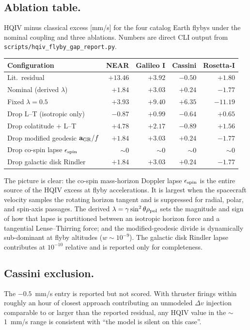 \documentclass[11pt]{amsart}
\begin{document}
\subsection*{Ablation table.}
HQIV minus classical excess [mm/s] for the four catalog Earth flybys under the nominal
coupling and three ablations. Numbers are direct CLI output from
\texttt{scripts/hqiv\_flyby\_gap\_report.py}.
\begin{center}
\begin{tabular}{@{}lrrrr@{}}
\toprule
Configuration & NEAR & Galileo I & Cassini & Rosetta-I \\
\midrule
Lit.\ residual           & $+13.46$ & $+3.92$ & $-0.50$ & $+1.80$ \\
\midrule
Nominal (derived $\lambda$)        & $+1.84$ & $+3.03$ & $+0.24$ & $-1.77$ \\
Fixed $\lambda=0.5$                & $+3.93$ & $+9.40$ & $+6.35$ & $-11.19$ \\
Drop L--T (isotropic only)         & $-0.87$ & $+0.99$ & $-0.64$ & $+0.65$ \\
Drop colatitude $+$ L--T           & $+4.78$ & $+2.17$ & $-0.89$ & $+1.56$ \\
Drop modified geodesic $\mathbf a_{\rm GR}/f$ & $+1.84$ & $+3.03$ & $+0.24$ & $-1.77$ \\
Drop co-spin lapse $\epsilon_{\rm spin}$ & $\sim 0$ & $\sim 0$ & $\sim 0$ & $\sim 0$ \\
Drop galactic disk Rindler         & $+1.84$ & $+3.03$ & $+0.24$ & $-1.77$ \\
\bottomrule
\end{tabular}
\end{center}
The picture is clear: the co-spin mass-horizon Doppler lapse $\epsilon_{\rm spin}$ is the
entire source of the HQIV excess at flyby accelerations. It is largest when the spacecraft
velocity samples the rotating horizon tangent and is suppressed for radial, polar, and
spin-axis passages. The derived $\lambda=\gamma\sin^2\theta\rho_{\rm pol}$ sets the
magnitude and sign of how that lapse is partitioned between an isotropic horizon force and
a tangential Lense--Thirring force; and the modified-geodesic divide is dynamically
sub-dominant at flyby altitudes ($w\sim 10^{-9}$). The galactic disk Rindler lapse
contributes at $10^{-10}$ relative and is reported only for completeness.

\subsection*{Cassini exclusion.}
The $-0.5$~mm/s entry is reported but not scored. With thruster firings within roughly an
hour of closest approach contributing an unmodeled $\Delta v$ injection comparable to or
larger than the reported residual, any HQIV value in the $\sim$1~mm/s range is consistent
with ``the model is silent on this case''.
\end{document}
